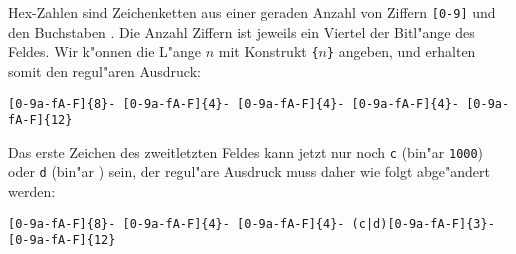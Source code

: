 \begin{loesung}
\begin{teilaufgaben}
\item
Hex-Zahlen sind Zeichenketten aus einer geraden Anzahl von
Ziffern \texttt{[0-9]} und den Buchstaben \text{[a-fA-F]}.
Die Anzahl Ziffern ist jeweils ein Viertel der Bitl"ange des Feldes.
Wir k"onnen die L"ange $n$ mit Konstrukt \texttt{\{$n$\}} angeben,
und erhalten somit den regul"aren Ausdruck:
\begin{center}
\texttt{[0-9a-fA-F]\{8\}-%
[0-9a-fA-F]\{4\}-%
[0-9a-fA-F]\{4\}-%
[0-9a-fA-F]\{4\}-%
[0-9a-fA-F]\{12\}}
\end{center}
\item
Das erste Zeichen des zweitletzten Feldes kann jetzt nur noch
\texttt{c} (bin"ar \texttt{1000}) oder \texttt{d} (bin"ar )
sein, der regul"are Ausdruck muss daher wie folgt abge"andert
werden:
\begin{center}
\texttt{[0-9a-fA-F]\{8\}-%
[0-9a-fA-F]\{4\}-%
[0-9a-fA-F]\{4\}-%
(c|d)[0-9a-fA-F]\{3\}-%
[0-9a-fA-F]\{12\}}
\end{center}
\end{teilaufgaben}
\end{loesung}




